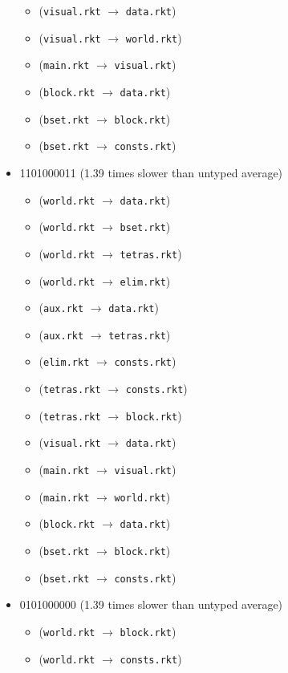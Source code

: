 \documentclass{article}
\newcommand{\mono}[1]{\texttt{#1}}
\begin{document}
\begin{itemize}
\begin{itemize}
  \item (\mono{visual.rkt} $\rightarrow$ \mono{data.rkt})
  \item (\mono{visual.rkt} $\rightarrow$ \mono{world.rkt})
  \item (\mono{main.rkt} $\rightarrow$ \mono{visual.rkt})
  \item (\mono{block.rkt} $\rightarrow$ \mono{data.rkt})
  \item (\mono{bset.rkt} $\rightarrow$ \mono{block.rkt})
  \item (\mono{bset.rkt} $\rightarrow$ \mono{consts.rkt})
  \end{itemize}
\item 1101000011 (1.39 times slower than untyped average)
  \begin{itemize}
  \item (\mono{world.rkt} $\rightarrow$ \mono{data.rkt})
  \item (\mono{world.rkt} $\rightarrow$ \mono{bset.rkt})
  \item (\mono{world.rkt} $\rightarrow$ \mono{tetras.rkt})
  \item (\mono{world.rkt} $\rightarrow$ \mono{elim.rkt})
  \item (\mono{aux.rkt} $\rightarrow$ \mono{data.rkt})
  \item (\mono{aux.rkt} $\rightarrow$ \mono{tetras.rkt})
  \item (\mono{elim.rkt} $\rightarrow$ \mono{consts.rkt})
  \item (\mono{tetras.rkt} $\rightarrow$ \mono{consts.rkt})
  \item (\mono{tetras.rkt} $\rightarrow$ \mono{block.rkt})
  \item (\mono{visual.rkt} $\rightarrow$ \mono{data.rkt})
  \item (\mono{main.rkt} $\rightarrow$ \mono{visual.rkt})
  \item (\mono{main.rkt} $\rightarrow$ \mono{world.rkt})
  \item (\mono{block.rkt} $\rightarrow$ \mono{data.rkt})
  \item (\mono{bset.rkt} $\rightarrow$ \mono{block.rkt})
  \item (\mono{bset.rkt} $\rightarrow$ \mono{consts.rkt})
  \end{itemize}
\item 0101000000 (1.39 times slower than untyped average)
  \begin{itemize}
  \item (\mono{world.rkt} $\rightarrow$ \mono{block.rkt})
  \item (\mono{world.rkt} $\rightarrow$ \mono{consts.rkt})

\end{itemize}
\end{itemize}
\end{document}
